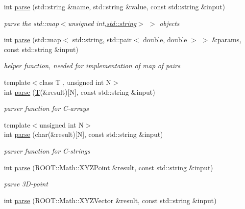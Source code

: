 \begin{DoxyCompactItemize}
int \hyperlink{namespace_d_d4hep_1_1_parsers_a62f00a034a77a322187e7cd94418f696}{parse} (std::string \&name, std::string \&value, const std::string \&input)
\begin{DoxyCompactList}\small\item\em parse the {\ttfamily std::map$<$unsigned int,\hyperlink{classstd_1_1string}{std::string}$>$ $>$} objects \item\end{DoxyCompactList}\item 
int \hyperlink{namespace_d_d4hep_1_1_parsers_a2af85c2e9ae2c5ec0e91d3e992d529c2}{parse} (std::map$<$ std::string, std::pair$<$ double, double $>$ $>$ \&params, const std::string \&input)
\begin{DoxyCompactList}\small\item\em helper function, needed for implementation of map of pairs \item\end{DoxyCompactList}\item 
{\footnotesize template$<$class T , unsigned int N$>$ }\\int \hyperlink{namespace_d_d4hep_1_1_parsers_ae69a0a480d1612aabcd8a37624dc1c1b}{parse} (\hyperlink{class_t}{T}(\&result)\mbox{[}N\mbox{]}, const std::string \&input)
\begin{DoxyCompactList}\small\item\em parser function for C-\/arrays \item\end{DoxyCompactList}\item 
{\footnotesize template$<$unsigned int N$>$ }\\int \hyperlink{namespace_d_d4hep_1_1_parsers_ad2e179991b827ffa95098ca1549db981}{parse} (char(\&result)\mbox{[}N\mbox{]}, const std::string \&input)
\begin{DoxyCompactList}\small\item\em parser function for C-\/strings \item\end{DoxyCompactList}\item 
int \hyperlink{namespace_d_d4hep_1_1_parsers_a7d90cf46a4c38175eed16be4cbc97d20}{parse} (ROOT::Math::XYZPoint \&result, const std::string \&input)
\begin{DoxyCompactList}\small\item\em parse 3D-\/point \item\end{DoxyCompactList}\item 
int \hyperlink{namespace_d_d4hep_1_1_parsers_a55f47fe0c36c09f779f5aeefe17e9bcb}{parse} (ROOT::Math::XYZVector \&result, const std::string \&input)

\end{DoxyCompactItemize}
